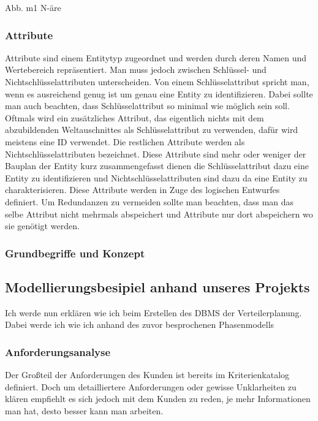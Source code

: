 \begin{flushleft}
Abb. m1 N-äre


\subsubsection{Attribute}

Attribute sind einem Entitytyp zugeordnet und werden durch deren Namen und Wertebereich repräsentiert. Man muss jedoch zwischen Schlüssel- und Nichtschlüsselattributen unterscheiden. Von einem Schlüsselattribut spricht man, wenn es ausreichend genug ist um genau eine Entity zu identifizieren. Dabei sollte man auch beachten, dass Schlüsselattribut so minimal wie möglich sein soll. Oftmals wird ein zusätzliches Attribut, das eigentlich nichts mit dem abzubildenden Weltauschnittes als Schlüsselattribut zu verwenden, dafür wird meistens eine ID verwendet. 
Die restlichen Attribute werden als Nichtschlüsselattributen bezeichnet. Diese Attribute sind mehr oder weniger der Bauplan der Entity kurz zusammengefasst dienen die Schlüsselattribut dazu eine Entity zu identifizieren und Nichtschlüsselattributen sind dazu da eine Entity zu charakterisieren. Diese Attribute werden in Zuge des logischen Entwurfes definiert. Um Redundanzen zu vermeiden sollte man beachten, dass man das selbe Attribut nicht mehrmals abspeichert und Attribute nur dort abspeichern wo sie genötigt werden.



\subsubsection{Grundbegriffe und Konzept}


\subsection{Modellierungsbesipiel anhand unseres Projekts}

Ich werde nun erklären wie ich beim Erstellen des DBMS der Verteilerplanung. Dabei werde ich wie ich anhand des zuvor besprochenen Phasenmodells 

\subsubsection{Anforderungsanalyse}

Der Großteil der Anforderungen des Kunden ist bereits im Kriterienkatalog definiert. Doch um detailliertere Anforderungen oder gewisse Unklarheiten zu klären empfiehlt es sich jedoch mit dem Kunden zu reden, je mehr Informationen man hat, desto besser kann man arbeiten. 


\end{flushleft}

